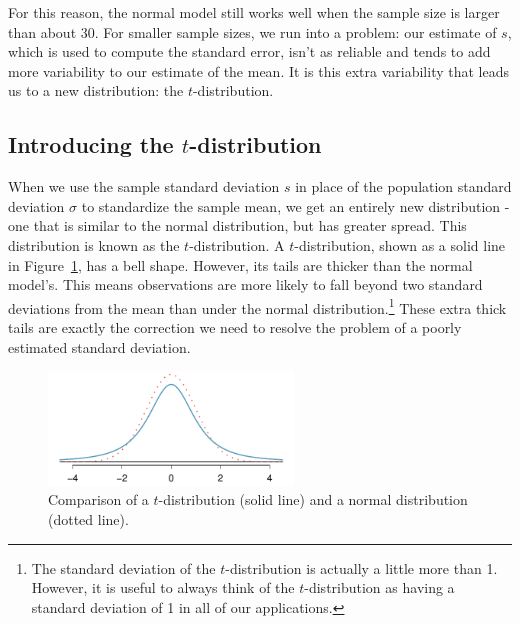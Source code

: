 For this reason, the normal model still works well when the sample size is larger than about 30. For smaller sample sizes, we run into a problem: our estimate of $s$, which is used to compute the standard error, isn't as reliable and tends to add more variability to our estimate of the mean. It is this extra variability that leads us to a new distribution: the \mbox{$t$-distribution}.


\textA{\newpage}

\subsection{Introducing the $t$-distribution}
\label{introducingTheTDistribution}


When we use the sample standard deviation $s$ in place of the population standard deviation $\sigma$ to standardize the sample mean, we get an entirely new distribution - one that is similar to the normal distribution, but has greater spread. This distribution is known as the $t$-distribution. A $t$-distribution, shown as a solid line in Figure~\ref{tDistCompareToNormalDist}, has a bell shape. However, its tails are thicker than the normal model's. This means observations are more likely to fall beyond two standard deviations from the mean than under the normal distribution.\footnote{The standard deviation of the $t$-distribution is actually a little more than 1. However, it is useful to always think of the $t$-distribution as having a standard deviation of 1 in all of our applications.} These extra thick tails are exactly the correction we need to resolve the problem of a poorly estimated standard deviation.

\begin{figure}[h]
\centering
\includegraphics[width=0.58\textwidth]{ch_inference_for_means/figures/tDistCompareToNormalDist/tDistCompareToNormalDist}
\caption{Comparison of a $t$-distribution (solid line) and a normal distribution (dotted line).}
\label{tDistCompareToNormalDist}
\end{figure}

